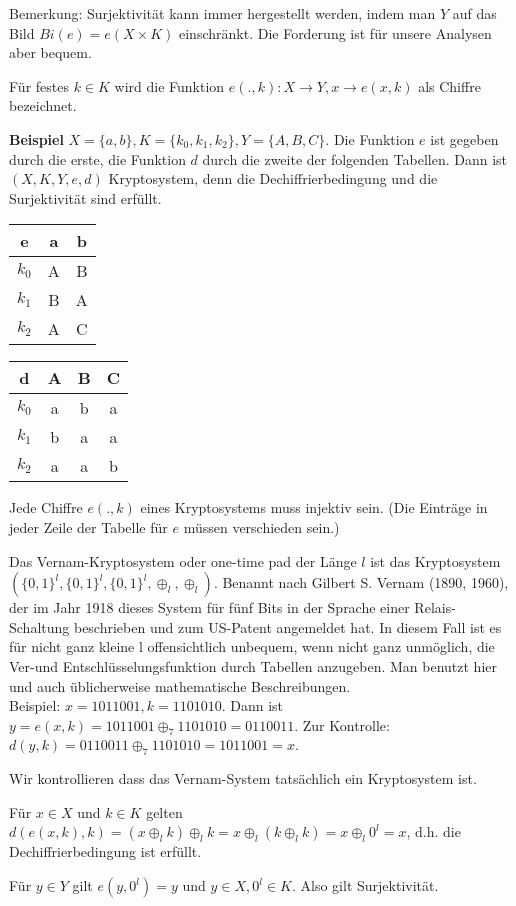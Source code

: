 \documentclass[a4paper]{article}
\begin{document}
\begin{multicols}{3}
    Bemerkung: Surjektivität kann immer hergestellt werden, indem man $Y$ auf das Bild $Bi(e) =e(X\times K)$ einschränkt. Die Forderung ist für unsere Analysen aber bequem.

    Für festes $k\in K$ wird die Funktion $e(.,k):X\rightarrow Y,x \rightarrow e(x,k)$ als Chiffre bezeichnet.

    \textbf{Beispiel} $X=\{a,b\},K=\{k_0,k_1,k_2\},Y=\{A,B,C\}$. Die Funktion $e$ ist gegeben durch die erste, die Funktion $d$ durch die zweite der folgenden Tabellen. Dann ist $(X,K,Y,e,d)$ Kryptosystem, denn die Dechiffrierbedingung und die Surjektivität sind erfüllt.

    \begin{tabular}{c|c|c}
    e & a & b \\\hline
    $k_0$ & A  & B \\
    $k_1$ & B  & A \\
    $k_2$ & A  & C 
    \end{tabular}

    \begin{tabular}{c|c|c|c}
    d   & A  & B  & C  \\\hline
    $k_0$ & a  & b & a \\
    $k_1$ & b  & a  & a \\
    $k_2$ & a  & a  & b 
    \end{tabular}
    
    Jede Chiffre $e(.,k)$ eines Kryptosystems muss injektiv sein. (Die Einträge in jeder Zeile der Tabelle für $e$ müssen verschieden sein.)

    Das Vernam-Kryptosystem oder one-time pad der Länge $l$ ist das Kryptosystem $(\{0,1\}^l,\{0,1\}^l,\{0,1\}^l,\oplus_l,\oplus_l)$. Benannt nach Gilbert S. Vernam (1890, 1960), der im Jahr 1918 dieses System für fünf Bits in der Sprache einer Relais-Schaltung beschrieben und zum US-Patent angemeldet hat.
    In diesem Fall ist es für nicht ganz kleine l offensichtlich unbequem, wenn nicht ganz unmöglich, die Ver-und Entschlüsselungsfunktion durch Tabellen anzugeben. Man benutzt hier und auch üblicherweise mathematische Beschreibungen.\\
    Beispiel: $x=1011001,k=1101010$. Dann ist $y=e(x,k)=1011001\oplus_7 1101010 = 0110011$. Zur Kontrolle: $d(y,k) = 0110011\oplus_7 1101010 = 1011001 =x$.

    Wir kontrollieren dass das Vernam-System tatsächlich ein Kryptosystem ist.
    \begin{enumerate*}
        \item Für $x\in X$ und $k\in K$ gelten $d(e(x,k),k)=(x\oplus_l k)\oplus_l k=x\oplus_l(k\oplus_l k) =x\oplus_l 0^l=x$, d.h. die Dechiffrierbedingung ist erfüllt.
        \item Für $y\in Y$ gilt $e(y,0^l) =y$ und $y\in X,0^l\in K$. Also gilt Surjektivität.
    \end{enumerate*}


\end{multicols}
\end{document}
